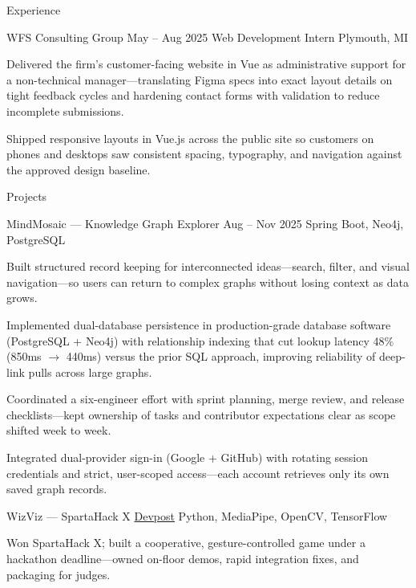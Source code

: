 \documentclass[
	11pt
]{../../../resume}
\begin{document}
\begin{rSection}{E}{xperience}
		\begin{rSectionEntry}
			{WFS Consulting Group}
			{May -- Aug 2025}
			{Web Development Intern}
			{}
			{Plymouth, MI}

			\item Delivered the firm’s customer-facing website in Vue as administrative support for a non-technical manager—translating Figma specs into exact layout details on tight feedback cycles and hardening contact forms with validation to reduce incomplete submissions.
			\item Shipped responsive layouts in Vue.js across the public site so customers on phones and desktops saw consistent spacing, typography, and navigation against the approved design baseline.
		\end{rSectionEntry}
	\end{rSection}

	\begin{rSection}{P}{rojects}
		\begin{rSectionEntry}
			{MindMosaic --- Knowledge Graph Explorer}
			{Aug -- Nov 2025}
			{}
			{Spring Boot, Neo4j, PostgreSQL}
			{}

			\item Built structured record keeping for interconnected ideas—search, filter, and visual navigation—so users can return to complex graphs without losing context as data grows.
			\item Implemented dual-database persistence in production-grade database software (PostgreSQL + Neo4j) with relationship indexing that cut lookup latency 48\% (850ms $\rightarrow$ 440ms) versus the prior SQL approach, improving reliability of deep-link pulls across large graphs.
			\item Coordinated a six-engineer effort with sprint planning, merge review, and release checklists—kept ownership of tasks and contributor expectations clear as scope shifted week to week.
			\item Integrated dual-provider sign-in (Google + GitHub) with rotating session credentials and strict, user-scoped access—each account retrieves only its own saved graph records.
		\end{rSectionEntry}

		\begin{rSectionEntry}
			{WizViz --- SpartaHack X}
			{\href{https://devpost.com/software/wizviz}{Devpost}}
			{}
			{Python, MediaPipe, OpenCV, TensorFlow}
			{}

			\item Won SpartaHack X; built a cooperative, gesture-controlled game under a hackathon deadline—owned on-floor demos, rapid integration fixes, and packaging for judges.
		\end{rSectionEntry}
	\end{rSection}
\end{document}
